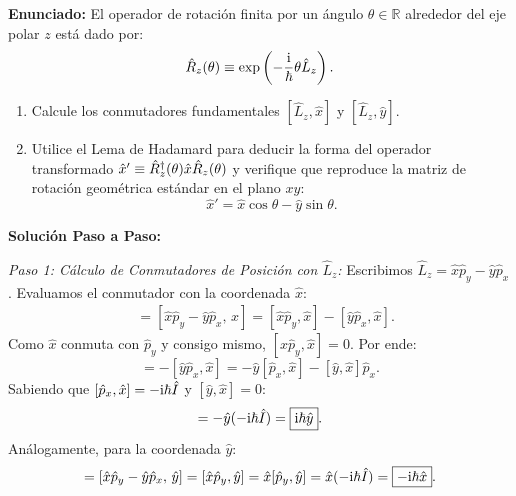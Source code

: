 \begin{ejemplobox}
    \textbf{Enunciado:} El operador de rotación finita por un ángulo $\theta \in \mathbb{R}$ alrededor del eje polar $z$ está dado por:
    \begin{equation}
        \hat{R}_z(\theta) \equiv \exp\left(-\frac{\mathrm{i}}{\hbar}\theta\hat{L}_z\right).
    \end{equation}
    \begin{enumerate}
        \item Calcule los conmutadores fundamentales $[\hat{L}_z, \hat{x}]$ y $[\hat{L}_z, \hat{y}]$.
        \item Utilice el Lema de Hadamard para deducir la forma del operador transformado $\hat{x}' \equiv \hat{R}_z^\dagger(\theta)\hat{x}\hat{R}_z(\theta)$ y verifique que reproduce la matriz de rotación geométrica estándar en el plano $xy$:
        \begin{equation}
            \hat{x}' = \hat{x}\cos\theta - \hat{y}\sin\theta.
        \end{equation}
    \end{enumerate}

    \textbf{Solución Paso a Paso:}

    \textit{Paso 1: Cálculo de Conmutadores de Posición con $\hat{L}_z$:}
    Escribimos $\hat{L}_z = \hat{x}\hat{p}_y - \hat{y}\hat{p}_x$. Evaluamos el conmutador con la coordenada $\hat{x}$:
    \begin{align}
        [\hat{L}_z, \hat{x}] &= [\hat{x}\hat{p}_y - \hat{y}\hat{p}_x, \, \hat{x}] = [\hat{x}\hat{p}_y, \hat{x}] - [\hat{y}\hat{p}_x, \hat{x}].
    \end{align}
    Como $\hat{x}$ conmuta con $\hat{p}_y$ y consigo mismo, $[\hat{x}\hat{p}_y, \hat{x}] = 0$. Por ende:
    \begin{equation}
        [\hat{L}_z, \hat{x}] = -[\hat{y}\hat{p}_x, \hat{x}] = -\hat{y}[\hat{p}_x, \hat{x}] - [\hat{y}, \hat{x}]\hat{p}_x.
    \end{equation}
    Sabiendo que $[\hat{p}_x, \hat{x}] = -\mathrm{i}\hbar\hat{I}$ y $[\hat{y}, \hat{x}] = 0$:
    \begin{equation}
        [\hat{L}_z, \hat{x}] = -\hat{y}(-\iu\hbar\hat{I}) = \boxed{\iu\hbar\hat{y}}.
        \label{eq:lz_x_comm}
    \end{equation}
    Análogamente, para la coordenada $\hat{y}$:
    \begin{equation}
        [\hat{L}_z, \hat{y}] = [\hat{x}\hat{p}_y - \hat{y}\hat{p}_x, \, \hat{y}] = [\hat{x}\hat{p}_y, \hat{y}] = \hat{x}[\hat{p}_y, \hat{y}] = \hat{x}(-\iu\hbar\hat{I}) = \boxed{-\iu\hbar\hat{x}}.
        \label{eq:lz_y_comm}
    \end{equation}


\end{ejemplobox}

